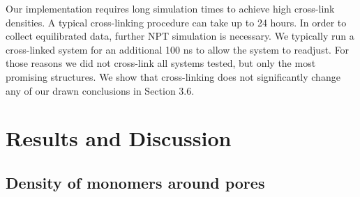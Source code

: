 \documentclass[journal=jpcbfk,manusciprt=article]{achemso}
\begin{document}
  Our implementation requires long simulation times to achieve high cross-link 
  densities. A typical cross-linking procedure can take up to 24 hours. In
  order to collect equilibrated data, further NPT simulation is necessary. We
  typically run a cross-linked system for an additional 100 ns to allow the system
  to readjust. For those reasons we did not cross-link all systems tested, but only
  the most promising structures. We show that cross-linking does not significantly
  change any of our drawn conclusions in Section 3.6.

  \section{Results and Discussion}
  
  \subsection{Density of monomers around pores}

%  
  
\end{document}
